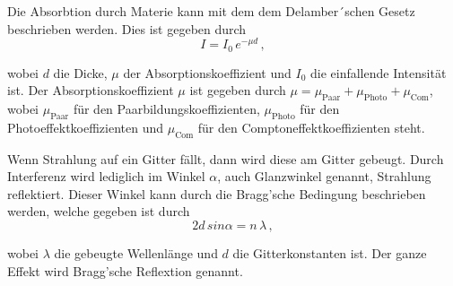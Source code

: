 \noindent
Die Absorbtion durch Materie kann mit dem dem Delamber´schen Gesetz beschrieben werden. Dies ist gegeben durch 
\begin{equation}
    I = I_0 \, e^{-\mu d} \, ,
    \label{eqn:Delamber}
\end{equation}

\noindent
wobei $d$ die Dicke, $\mu$ der Absorptionskoeffizient und $I_0$ die einfallende Intensität ist. Der Absorptionskoeffizient $\mu$ ist gegeben durch 
$\mu = \mu_\text{Paar} + \mu_\text{Photo} + \mu_\text{Com}$, wobei $\mu_\text{Paar}$ für den Paarbildungskoeffizienten, $\mu_\text{Photo}$  für den Photoeffektkoeffizienten und
$\mu_\text{Com}$ für den Comptoneffektkoeffizienten steht.

\noindent
Wenn Strahlung auf ein Gitter fällt, dann wird diese am Gitter gebeugt. Durch Interferenz wird lediglich im Winkel $\alpha$, auch Glanzwinkel genannt, Strahlung reflektiert.
Dieser Winkel kann durch die Bragg'sche Bedingung beschrieben werden, welche gegeben ist durch
\begin{equation}
    2 d \, sin \alpha = n \, \lambda \, ,
    \label{eqn:Bragg}
\end{equation}

\noindent
wobei $\lambda$ die gebeugte Wellenlänge und $d$ die Gitterkonstanten ist. Der ganze Effekt wird Bragg'sche Reflextion genannt.
